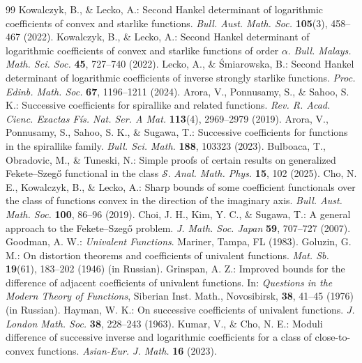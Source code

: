 \documentclass[10pt,a4paper]{amsart}
\numberwithin{equation}{section}
\begin{document}
\begin{thebibliography}{99}
 Kowalczyk, B., \& Lecko, A.: Second Hankel determinant of logarithmic coefficients of convex and starlike functions. \emph{Bull. Aust. Math. Soc.} \textbf{105}(3), 458--467 (2022).
 Kowalczyk, B., \& Lecko, A.: Second Hankel determinant of logarithmic coefficients of convex and starlike functions of order $\alpha$. \emph{Bull. Malays. Math. Sci. Soc.} \textbf{45}, 727--740 (2022).
 Lecko, A., \& \'{S}miarowska, B.: Second Hankel determinant of logarithmic coefficients of inverse strongly starlike functions. \emph{Proc. Edinb. Math. Soc.} \textbf{67}, 1196--1211 (2024).
 Arora, V., Ponnusamy, S., \& Sahoo, S. K.: Successive coefficients for spirallike and related functions. \emph{Rev. R. Acad. Cienc. Exactas F\'is. Nat. Ser. A Mat.} \textbf{113}(4), 2969--2979 (2019).
 Arora, V., Ponnusamy, S., Sahoo, S. K., \& Sugawa, T.: Successive coefficients for functions in the spirallike family. \emph{Bull. Sci. Math.} \textbf{188}, 103323 (2023).
 Bulboaca, T., Obradovic, M., \& Tuneski, N.: Simple proofs of certain results on generalized Fekete--Szeg\H{o} functional in the class $\mathcal{S}$. \emph{Anal. Math. Phys.} \textbf{15}, 102 (2025).
 Cho, N. E., Kowalczyk, B., \& Lecko, A.: Sharp bounds of some coefficient functionals over the class of functions convex in the direction of the imaginary axis. \emph{Bull. Aust. Math. Soc.} \textbf{100}, 86--96 (2019).
 Choi, J. H., Kim, Y. C., \& Sugawa, T.: A general approach to the Fekete--Szeg\H{o} problem. \emph{J. Math. Soc. Japan} \textbf{59}, 707--727 (2007).
 Goodman, A. W.: \emph{Univalent Functions}. Mariner, Tampa, FL (1983).
 Goluzin, G. M.: On distortion theorems and coefficients of univalent functions. \emph{Mat. Sb.} \textbf{19}(61), 183--202 (1946) (in Russian).
 Grinspan, A. Z.: Improved bounds for the difference of adjacent coefficients of univalent functions. In: \emph{Questions in the Modern Theory of Functions}, Siberian Inst. Math., Novosibirsk, \textbf{38}, 41--45 (1976) (in Russian).
 Hayman, W. K.: On successive coefficients of univalent functions. \emph{J. London Math. Soc.} \textbf{38}, 228--243 (1963).
 Kumar, V., \& Cho, N. E.: Moduli difference of successive inverse and logarithmic coefficients for a class of close-to-convex functions. \emph{Asian-Eur. J. Math.} \textbf{16} (2023).

\end{thebibliography}
\end{document}
